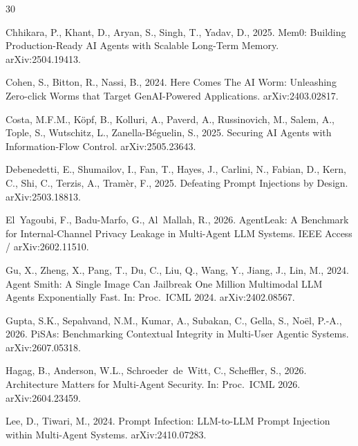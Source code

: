 \documentclass{article}
\begin{document}
\begin{thebibliography}{30}
\providecommand{\natexlab}[1]{#1}
\providecommand{\url}[1]{\texttt{#1}}

Chhikara, P., Khant, D., Aryan, S., Singh, T., Yadav, D., 2025. Mem0: Building Production-Ready AI Agents with Scalable Long-Term Memory. arXiv:2504.19413.

Cohen, S., Bitton, R., Nassi, B., 2024. Here Comes The AI Worm: Unleashing Zero-click Worms that Target GenAI-Powered Applications. arXiv:2403.02817.

Costa, M.F.M., K\"opf, B., Kolluri, A., Paverd, A., Russinovich, M., Salem, A., Tople, S., Wutschitz, L., Zanella-B\'eguelin, S., 2025. Securing AI Agents with Information-Flow Control. arXiv:2505.23643.

Debenedetti, E., Shumailov, I., Fan, T., Hayes, J., Carlini, N., Fabian, D., Kern, C., Shi, C., Terzis, A., Tram\`er, F., 2025. Defeating Prompt Injections by Design. arXiv:2503.18813.

El~Yagoubi, F., Badu-Marfo, G., Al~Mallah, R., 2026. AgentLeak: A Benchmark for Internal-Channel Privacy Leakage in Multi-Agent LLM Systems. IEEE Access / arXiv:2602.11510.

Gu, X., Zheng, X., Pang, T., Du, C., Liu, Q., Wang, Y., Jiang, J., Lin, M., 2024. Agent Smith: A Single Image Can Jailbreak One Million Multimodal LLM Agents Exponentially Fast. In: Proc.\ ICML 2024. arXiv:2402.08567.

Gupta, S.K., Sepahvand, N.M., Kumar, A., Subakan, C., Gella, S., No\"el, P.-A., 2026. PiSAs: Benchmarking Contextual Integrity in Multi-User Agentic Systems. arXiv:2607.05318.

Hagag, B., Anderson, W.L., Schroeder~de~Witt, C., Scheffler, S., 2026. Architecture Matters for Multi-Agent Security. In: Proc.\ ICML 2026. arXiv:2604.23459.

Lee, D., Tiwari, M., 2024. Prompt Infection: LLM-to-LLM Prompt Injection within Multi-Agent Systems. arXiv:2410.07283.


\end{thebibliography}
\end{document}
